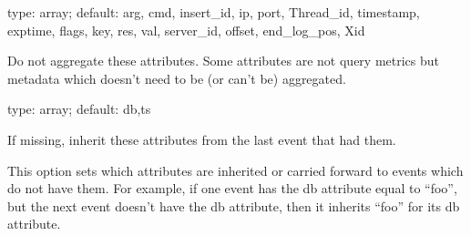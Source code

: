 \documentclass[letterpaper,10pt,english]{sphinxmanual}
\begin{document}
\begin{fulllineitems}
\label{\detokenize{mariadb-query-digest:cmdoption-mariadb-query-digest-ignore-attributes}}
\sphinxAtStartPar
type: array; default: arg, cmd, insert\_id, ip, port, Thread\_id, timestamp, exptime, flags, key, res, val, server\_id, offset, end\_log\_pos, Xid

\sphinxAtStartPar
Do not aggregate these attributes.  Some attributes are not query metrics
but metadata which doesn’t need to be (or can’t be) aggregated.

\end{fulllineitems}


\begin{fulllineitems}
\label{\detokenize{mariadb-query-digest:cmdoption-mariadb-query-digest-inherit-attributes}}
\sphinxAtStartPar
type: array; default: db,ts

\sphinxAtStartPar
If missing, inherit these attributes from the last event that had them.

\sphinxAtStartPar
This option sets which attributes are inherited or carried forward to events
which do not have them.  For example, if one event has the db attribute equal
to “foo”, but the next event doesn’t have the db attribute, then it inherits
“foo” for its db attribute.

\end{fulllineitems}

\end{document}
